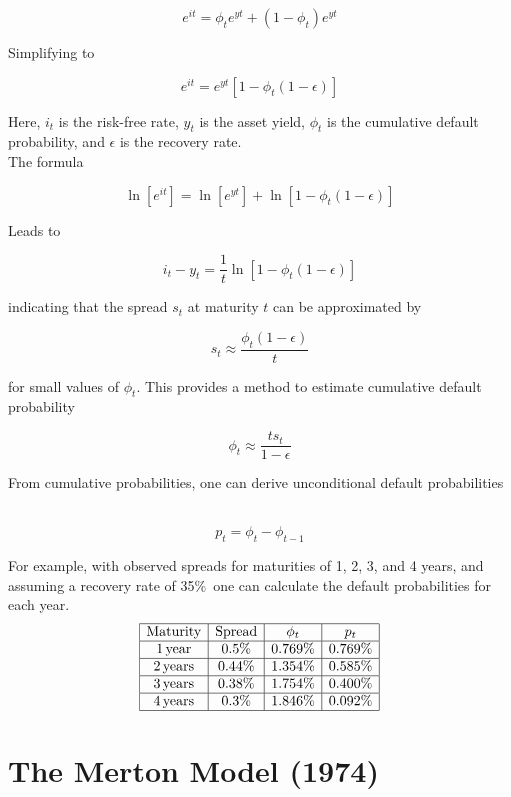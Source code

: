 \documentclass[a4paper,10pt]{article}
\begin{document}
\[e^{i t} = \phi_t e^{y t} + (1 - \phi_t)e^{y t}\]

\noindent Simplifying to \

\[e^{i t} = e^{y t} [1 - \phi_t (1 - \epsilon)]\]

\noindent Here, \( i_t \) is the risk-free rate, \( y_t \) is the asset yield, \( \phi_t \) is the cumulative default probability, and \( \epsilon \) is the recovery rate. \\

\noindent The formula \

\[\ln[e^{i t}] = \ln[e^{y t}] + \ln[1 - \phi_t (1 - \epsilon)]\]

\noindent Leads to \

\[i_t - y_t = \frac{1}{t} \ln[1 - \phi_t (1 - \epsilon)]\]

\noindent indicating that the spread \( s_t \) at maturity \( t \) can be approximated by \

\[s_t \approx \frac{\phi_t (1 - \epsilon)}{t}\]

\noindent for small values of \( \phi_t \). This provides a method to estimate cumulative default probability \

\[\phi_t \approx \frac{t s_t}{1 - \epsilon}\]

\noindent From cumulative probabilities, one can derive unconditional default probabilities \

\[p_t = \phi_t - \phi_{t-1}\]

\noindent For example, with observed spreads for maturities of 1, 2, 3, and 4 years, and assuming a recovery rate of 35\%\, one can calculate the default probabilities for each year. \\

\[
\begin{array}{|c|c|c|c|}
\hline
\text{Maturity} & \text{Spread} & \phi_t & p_t \\ \hline
1 \, \text{year} & 0.5\% & 0.769\% & 0.769\% \\ \hline
2 \, \text{years} & 0.44\% & 1.354\% & 0.585\% \\ \hline
3 \, \text{years} & 0.38\% & 1.754\% & 0.400\% \\ \hline
4 \, \text{years} & 0.3\% & 1.846\% & 0.092\% \\ \hline
\end{array}
\]



\section{The Merton Model (1974)}
\end{document}
